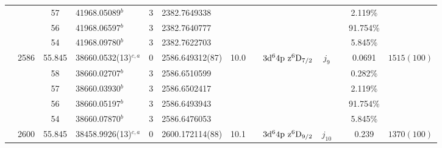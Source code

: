 \begin{table*}
\begin{center}
{\begin{tabular}{:l;l;c;l;c;l;c;l;l;c;c;c;c}
\rowstyle{\itshape}               &        & 57        & 41968.05089$^{b}$                & 3 &  2382.7649338      &      & $                                        $ & $                                        $ & $      $ &              & 2.119\%   & $          $\\
\rowstyle{\itshape}               &        & 56        & 41968.06597$^{b}$                & 3 &  2382.7640777      &      & $                                        $ & $                                        $ & $      $ &              & 91.754\%  & $          $\\
\rowstyle{\itshape}               &        & 54        & 41968.09780$^{b}$                & 3 &  2382.7622703      &      & $                                        $ & $                                        $ & $      $ &              & 5.845\%   & $          $\\
                                  & 2586   & 55.845    & 38660.0532(13)$^{c,a}$           & 0 &   2586.649312(87)  & 10.0 & $                                        $ & $3\rm{d}^64\rm{p~z}^6\rm{D}_{7/2}        $ & $j_{9} $ &              & 0.0691    & $ 1515(100)$\\
\rowstyle{\itshape}               &        & 58        & 38660.02707$^{b}$                & 3 &  2586.6510599      &      & $                                        $ & $                                        $ & $      $ &              & 0.282\%   & $          $\\
\rowstyle{\itshape}               &        & 57        & 38660.03930$^{b}$                & 3 &  2586.6502417      &      & $                                        $ & $                                        $ & $      $ &              & 2.119\%   & $          $\\
\rowstyle{\itshape}               &        & 56        & 38660.05197$^{b}$                & 3 &  2586.6493943      &      & $                                        $ & $                                        $ & $      $ &              & 91.754\%  & $          $\\
\rowstyle{\itshape}               &        & 54        & 38660.07870$^{b}$                & 3 &  2586.6476053      &      & $                                        $ & $                                        $ & $      $ &              & 5.845\%   & $          $\\
                                  & 2600   & 55.845    & 38458.9926(13)$^{c,a}$           & 0 &   2600.172114(88)  & 10.1 & $                                        $ & $3\rm{d}^64\rm{p~z}^6\rm{D}_{9/2}        $ & $j_{10}$ &              & 0.239     & $ 1370(100)$\\

\end{tabular}}
\end{center}
\end{table*}
